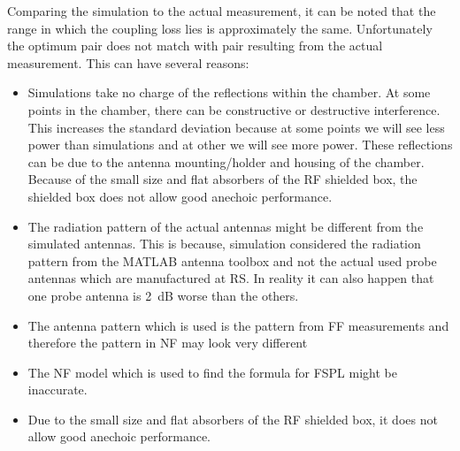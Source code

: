 Comparing the simulation to the actual measurement, it can be noted that the range in which the coupling loss lies is approximately the same. Unfortunately the optimum pair does not match with pair resulting from the actual measurement. This can have several reasons: 
\begin{itemize}
\item Simulations take no charge of the reflections within the chamber. At some points in the chamber, there can be constructive or destructive interference. This increases the standard deviation because at some points we will see less power than simulations and at other we will see more power. These reflections can be due to the antenna mounting/holder and housing of the chamber. Because of the small size and flat absorbers of the \acs{RF} shielded box, the shielded box does not allow good anechoic performance.
\item The radiation pattern of the actual antennas might be different from the simulated antennas. This is because, simulation considered the radiation pattern from the MATLAB\textregistered{} antenna toolbox and not the actual used probe antennas which are manufactured at \acs{RS}\textregistered{}. In reality it can also happen that one probe antenna is 2~dB worse than the others. 
\item The antenna pattern which is used is the pattern from \acf{FF} measurements and therefore the pattern in \acf{NF} may look very different
\item The \acf{NF} model which is used to find the formula for \acf{FSPL} might be inaccurate.
\item Due to the small size and flat absorbers of the RF shielded box, it does not allow good anechoic performance.
\end{itemize}



